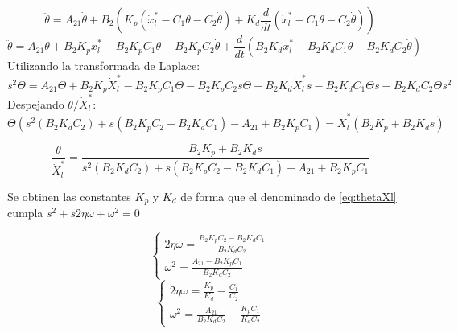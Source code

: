 \documentclass{article}
\begin{document}
                \begin{equation}
                    \ddot{\theta} = A_{21} \dot{\theta} + B_{2} ( K_p (\dot{x}_l^*-C_1\theta-C_2\dot{\theta}) + K_d \frac{d}{dt}(\dot{x}_l^*-C_1\theta-C_2\dot{\theta}))
                \end{equation}
                \begin{equation}
                    \ddot{\theta} = A_{21} \theta + B_{2} K_p \dot{x}_l^* - B_{2} K_p C_1 \theta - B_{2} K_p C_2 \dot{\theta} + \frac{d}{dt} \left( B_{2} K_d \dot{x}_l^* - B_{2} K_d C_1 \theta - B_{2} K_d C_2 \dot{\theta} \right)
                \end{equation}
                Utilizando la transformada de Laplace:
                \begin{equation}
                    s^2 \Theta = A_{21} \Theta + B_{2} K_p \dot{X}_l^* - B_{2} K_p C_1 \Theta - B_{2} K_p C_2 s \Theta + B_{2} K_d \dot{X}_l^*s - B_{2} K_d C_1 \Theta s - B_{2} K_d C_2 \Theta s^2
                \end{equation}
                Despejando \(\theta/\dot{X}_l^*\):
                \begin{equation}
                    \Theta( s^2(B_{2} K_d C_2) + s (B_{2} K_p C_2 - B_{2} K_d C_1) - A_{21} + B_{2} K_p C_1) = \dot{X}_l^* (B_{2} K_p + B_{2} K_d s)
                \end{equation}

                \begin{equation} \label{eq:thetaXl}
                    \frac{\theta}{\dot{X}_l^*}= \frac{B_{2} K_p + B_{2} K_d s}{s^2(B_{2} K_d C_2) + s (B_{2} K_p C_2 - B_{2} K_d C_1) - A_{21} + B_{2} K_p C_1}
                \end{equation}

                Se obtinen las constantes \(K_p\) y \(K_d\) de forma que el denominado de \ref{eq:thetaXl} cumpla \(s^2 + s 2 \eta \omega + \omega^2 = 0\)

                \begin{equation}
                    \begin{cases}
                        2 \eta \omega = \frac{B_{2} K_p C_2 - B_{2} K_d C_1 }{B_{2} K_d C_2} \\
                        \omega^2 = \frac{A_{21} - B_{2} K_p C_1}{B_{2} K_d C_2}
                    \end{cases}
                \end{equation}
                \begin{equation}
                    \begin{cases}
                        2 \eta \omega = \frac{K_p}{K_d}-\frac{C_1 }{C_2} \\
                        \omega^2 = \frac{A_{21}}{B_{2} K_d C_2} - \frac{K_p C_1}{K_d C_2}
                    \end{cases}
                \end{equation}
\end{document}
